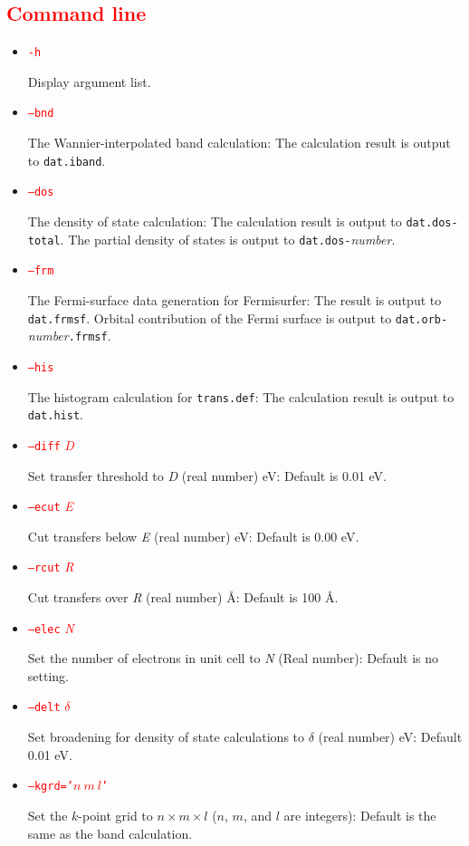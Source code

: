 \documentclass{article}
\newcommand{\tr}[1]{\textcolor{red}{#1}}
\begin{document}
\subsection{\label{command}\tr{Command line}}
\begin{itemize}
\item \tr{{\tt -h}} 

Display argument list.

\item \tr{{\tt --bnd}}

The Wannier-interpolated band calculation: The calculation result is output to {\tt dat.iband}.

\item \tr{{\tt --dos}} 

The density of state calculation: The calculation result is output to {\tt dat.dos-total}. The partial density of states is output to {\tt dat.dos-}{\it number}.

\item \tr{{\tt --frm}} 

The Fermi-surface data generation for {\sc Fermisurfer}: The result is output to {\tt dat.frmsf}. Orbital contribution of the Fermi surface is output to {\tt dat.orb-}{\it number}{\tt .frmsf}.

\item \tr{{\tt --his}} 

The histogram calculation for {\tt trans.def}: The calculation result is output to {\tt dat.hist}.

\item \tr{{\tt --diff} {\it D}}

Set transfer threshold to {\it D} (real number) eV: Default is 0.01 eV.

\item \tr{{\tt --ecut} {\it E}}

Cut transfers below {\it E} (real number) eV: Default is 0.00 eV. 

\item \tr{{\tt --rcut} {\it R}}

Cut transfers over {\it R} (real number) \AA: Default is 100 \AA.

\item \tr{{\tt --elec} {\it N}} 

Set the number of electrons in unit cell to {\it N} (Real number): Default is no setting. 

\item \tr{{\tt --delt} $\delta$} 

Set broadening for density of state calculations to $\delta$ (real number) eV: Default 0.01 eV. 

\item \tr{{\tt --kgrd='}$n\ m\ l${\tt '}}

Set the $k$-point grid to $n \times m \times l$ ($n$, $m$, and $l$ are integers): Default is the same as the band calculation.

\end{itemize} 
\end{document}
